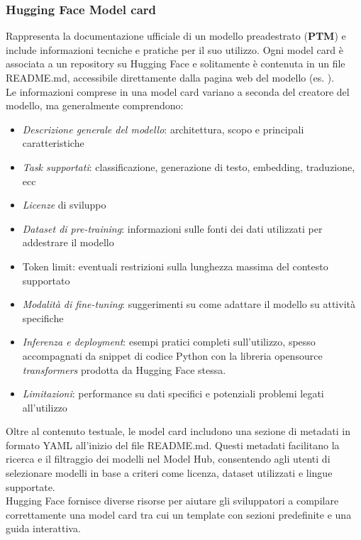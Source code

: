 \documentclass{article}
\begin{document}
\subsubsection{Hugging Face Model card \cite{huggingface_model_cards}} 
Rappresenta la documentazione ufficiale di un modello preadestrato (\textbf{PTM})  e include informazioni tecniche e pratiche per il suo utilizzo. Ogni model card è associata a un repository su Hugging Face e solitamente è contenuta in un file README.md, accessibile direttamente dalla pagina web del modello (es. \cite{all-MiniLM-L6-v2}).\\
Le informazioni comprese in una model card variano a seconda del creatore del modello, ma generalmente comprendono:
\begin{itemize}
    \item \textit{Descrizione generale del modello}: architettura, scopo e principali caratteristiche
    \item \textit{Task supportati}: classificazione, generazione di testo, embedding, traduzione, ecc
    \item \textit{Licenze} di sviluppo
    \item \textit{Dataset di pre-training}: informazioni sulle fonti dei dati utilizzati per addestrare il modello
    \item {Token limit}: eventuali restrizioni sulla lunghezza massima del contesto supportato
    \item \textit{Modalità di fine-tuning}: suggerimenti su come adattare il modello su attività specifiche
    \item \textit{Inferenza e deployment}: esempi pratici completi sull'utilizzo, spesso accompagnati da snippet di codice Python con la libreria opensource \textit{transformers}\cite{wolf-etal-2020-transformers} prodotta da Hugging Face stessa.
    \item \textit{Limitazioni}: performance su dati specifici e potenziali problemi legati all’utilizzo
\end{itemize}
Oltre al contenuto testuale, le model card includono una sezione di metadati in formato YAML all'inizio del file README.md. Questi metadati facilitano la ricerca e il filtraggio dei modelli nel Model Hub, consentendo agli utenti di selezionare modelli in base a criteri come licenza, dataset utilizzati e lingue supportate.\\
Hugging Face fornisce diverse risorse per aiutare gli sviluppatori a compilare correttamente una model card tra cui un template con sezioni predefinite e una guida interattiva.\\
\end{document}
